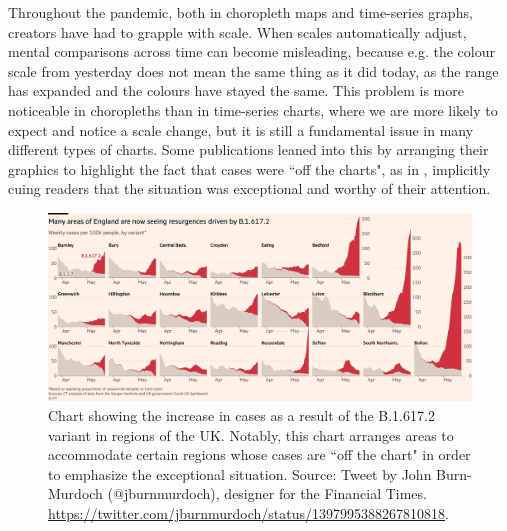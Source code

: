 \documentclass[article]{jdssv}\usepackage[]{graphicx}\usepackage[]{color}
\begin{document}


Throughout the pandemic, both in choropleth maps and time-series graphs, creators have had to grapple with scale. When scales automatically adjust, mental comparisons across time can become misleading, because e.g. the colour scale from yesterday does not mean the same thing as it did today, as the range has expanded and the colours have stayed the same. This problem is more noticeable in choropleths than in time-series charts, where we are more likely to expect and notice a scale change, but it is still a fundamental issue in many different types of charts. Some publications leaned into this by arranging their graphics to highlight the fact that cases were ``off the charts", as in , implicitly cuing readers that the situation was exceptional and worthy of their attention.

\begin{figure}
\includegraphics[width=.99\linewidth]{ft-off-charts}
\caption{Chart showing the increase in cases as a result of the B.1.617.2 variant in regions of the UK. Notably, this chart arranges areas to accommodate certain regions whose cases are ``off the chart" in order to emphasize the exceptional situation. Source: Tweet by John Burn-Murdoch (@jburnmurdoch), designer for the Financial Times. \url{https://twitter.com/jburnmurdoch/status/1397995388267810818}.}
\label{fig:jbm-tweet}
\end{figure}
\end{document}
